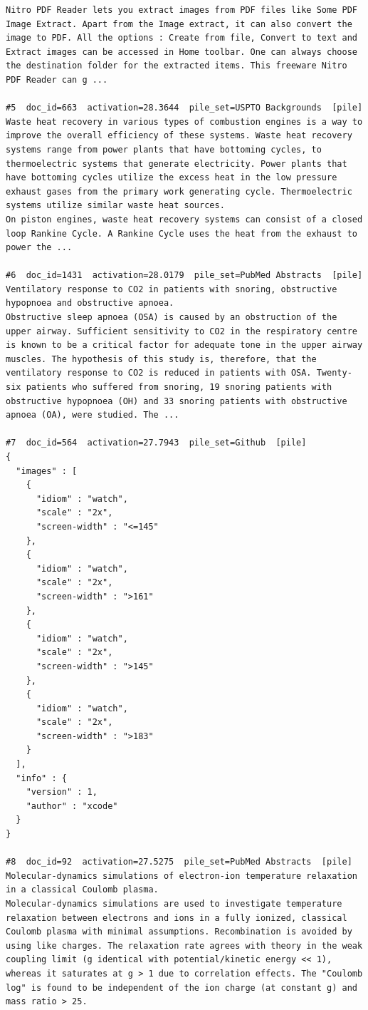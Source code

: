 \begin{verbatim}
Nitro PDF Reader lets you extract images from PDF files like Some PDF Image Extract. Apart from the Image extract, it can also convert the image to PDF. All the options : Create from file, Convert to text and Extract images can be accessed in Home toolbar. One can always choose the destination folder for the extracted items. This freeware Nitro PDF Reader can g ...

#5  doc_id=663  activation=28.3644  pile_set=USPTO Backgrounds  [pile]
Waste heat recovery in various types of combustion engines is a way to improve the overall efficiency of these systems. Waste heat recovery systems range from power plants that have bottoming cycles, to thermoelectric systems that generate electricity. Power plants that have bottoming cycles utilize the excess heat in the low pressure exhaust gases from the primary work generating cycle. Thermoelectric systems utilize similar waste heat sources.
On piston engines, waste heat recovery systems can consist of a closed loop Rankine Cycle. A Rankine Cycle uses the heat from the exhaust to power the ...

#6  doc_id=1431  activation=28.0179  pile_set=PubMed Abstracts  [pile]
Ventilatory response to CO2 in patients with snoring, obstructive hypopnoea and obstructive apnoea.
Obstructive sleep apnoea (OSA) is caused by an obstruction of the upper airway. Sufficient sensitivity to CO2 in the respiratory centre is known to be a critical factor for adequate tone in the upper airway muscles. The hypothesis of this study is, therefore, that the ventilatory response to CO2 is reduced in patients with OSA. Twenty-six patients who suffered from snoring, 19 snoring patients with obstructive hypopnoea (OH) and 33 snoring patients with obstructive apnoea (OA), were studied. The ...

#7  doc_id=564  activation=27.7943  pile_set=Github  [pile]
{
  "images" : [
    {
      "idiom" : "watch",
      "scale" : "2x",
      "screen-width" : "<=145"
    },
    {
      "idiom" : "watch",
      "scale" : "2x",
      "screen-width" : ">161"
    },
    {
      "idiom" : "watch",
      "scale" : "2x",
      "screen-width" : ">145"
    },
    {
      "idiom" : "watch",
      "scale" : "2x",
      "screen-width" : ">183"
    }
  ],
  "info" : {
    "version" : 1,
    "author" : "xcode"
  }
}

#8  doc_id=92  activation=27.5275  pile_set=PubMed Abstracts  [pile]
Molecular-dynamics simulations of electron-ion temperature relaxation in a classical Coulomb plasma.
Molecular-dynamics simulations are used to investigate temperature relaxation between electrons and ions in a fully ionized, classical Coulomb plasma with minimal assumptions. Recombination is avoided by using like charges. The relaxation rate agrees with theory in the weak coupling limit (g identical with potential/kinetic energy << 1), whereas it saturates at g > 1 due to correlation effects. The "Coulomb log" is found to be independent of the ion charge (at constant g) and mass ratio > 25.


\end{verbatim}

